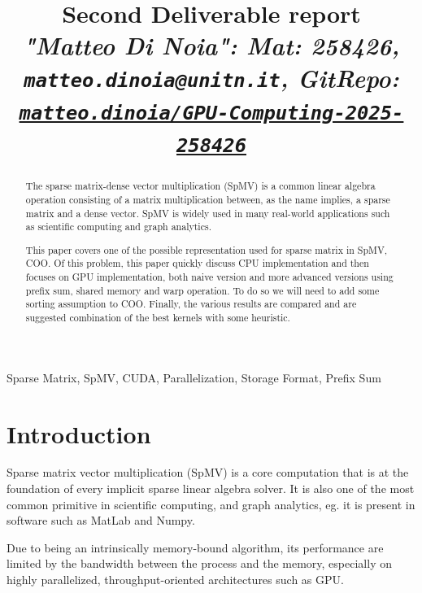 \documentclass[conference]{IEEEtran}
\newcommand{\torem}[1]{\color{olive} #1 \color{black}}
\begin{document}
\title{Second Deliverable report \\
\footnotesize \textit{"Matteo Di Noia": Mat: 258426, \texttt{matteo.dinoia@unitn.it}, GitRepo: \texttt{\href{https://github.com/matteo-dinoia/GPU-Computing-2025-258426}{matteo.dinoia/GPU-Computing-2025-258426}}}}

\maketitle

\begin{abstract}
The sparse matrix-dense vector multiplication (SpMV) is a common linear algebra operation consisting of a matrix multiplication between, as the name implies, a sparse matrix and a dense vector. SpMV is widely used in many real-world applications such as scientific computing and graph analytics.

This paper covers one of the possible representation used for sparse matrix in SpMV, COO. Of this problem, this paper quickly discuss CPU implementation and then focuses on GPU implementation, both naive version and more advanced versions using prefix sum, shared memory and warp operation. To do so we will need to add some sorting assumption to COO. Finally, the various results are compared and are suggested combination of the best kernels with some heuristic.
\end{abstract}

\begin{IEEEkeywords}
Sparse Matrix, SpMV, CUDA, Parallelization, Storage Format, Prefix Sum
\end{IEEEkeywords}

\section{Introduction}

Sparse matrix vector multiplication (SpMV) is a core computation that is at the foundation of every implicit sparse linear algebra solver. It is also one of the most common primitive in scientific computing, and graph analytics, eg. it is present in software such as MatLab and Numpy.

Due to being an intrinsically memory-bound algorithm, its performance are limited by the bandwidth between the process and the memory, especially on highly parallelized, throughput-oriented architectures such as GPU.
\end{document}
